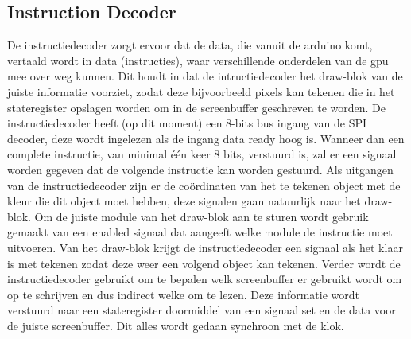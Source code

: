 \subsection{Instruction Decoder}
De instructiedecoder zorgt ervoor dat de data, die vanuit de arduino komt, vertaald wordt in data (instructies), waar verschillende onderdelen van de gpu mee over weg kunnen. 
Dit houdt in dat de intructiedecoder het draw-blok van de juiste informatie voorziet, zodat deze bijvoorbeeld pixels kan tekenen die in het stateregister opslagen worden om in de screenbuffer geschreven te worden.
De instructiedecoder heeft (op dit moment) een 8-bits bus ingang van de SPI decoder, deze wordt ingelezen als de ingang data ready hoog is.
Wanneer dan een complete instructie, van minimal één keer 8 bits, verstuurd is, zal er een signaal worden gegeven dat de volgende instructie kan worden gestuurd.
Als uitgangen van de instructiedecoder zijn er de coördinaten van het te tekenen object met de kleur die dit object moet hebben, deze signalen gaan natuurlijk naar het draw-blok.
Om de juiste module van het draw-blok aan te sturen wordt gebruik gemaakt van een enabled signaal dat aangeeft welke module de instructie moet uitvoeren.
Van het draw-blok krijgt de instructiedecoder een signaal als het klaar is met tekenen zodat deze weer een volgend object kan tekenen. 
Verder wordt de instructiedecoder gebruikt om te bepalen welk screenbuffer er gebruikt wordt om op te schrijven en dus indirect welke om te lezen. Deze informatie wordt verstuurd naar een stateregister doormiddel van een signaal set en de data voor de juiste screenbuffer. Dit alles wordt gedaan synchroon met de klok.

